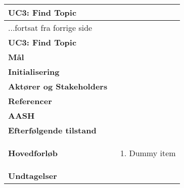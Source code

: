 \begin{center} \centering \label{ucFindTopic}
	\begin{longtable}{|p{4.6cm}|p{9.4cm}|}  %
	\hline
		\multicolumn{2}{|l|}{\textbf{UC3: Find Topic}} \\\hline
		\endfirsthead
		
		\multicolumn{2}{l}{...fortsat fra forrige side} \\ \hline %
		\multicolumn{2}{|l|}{\textbf{UC3: Find Topic}} \\\hline
		\endhead	
		
		\textbf{Mål}						&%
		\\\hline
		\textbf{Initialisering}			&%
		\\\hline
		\textbf{Aktører og Stakeholders}	&%
		\\\hline 
		\textbf{Referencer}				&%
		\\\hline
		\textbf{AASH}					&%
		\\\hline
		\textbf{Efterfølgende tilstand}	&%
		\\\hline
		\textbf{Hovedforløb}					
			&\begin{enumerate}
				
				\item Dummy item
			\end{enumerate}\\\hline
		\textbf{Undtagelser}
			&			
			\\\hline
	\end{longtable} 
\end{center}